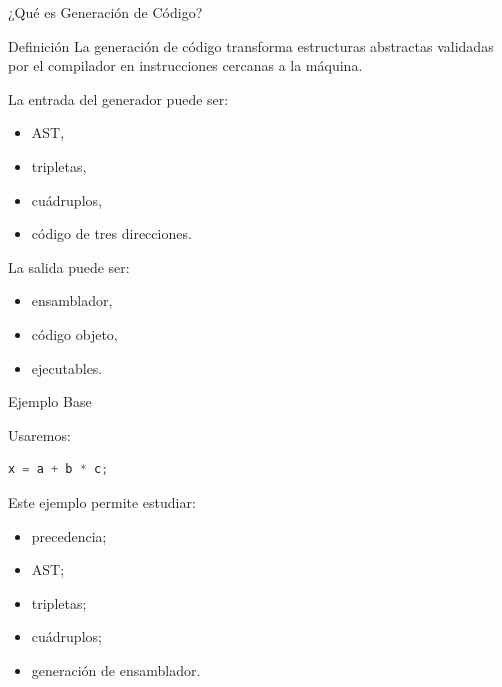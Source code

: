\documentclass{beamer}
\begin{document}
\begin{frame}{¿Qué es Generación de Código?}

\begin{block}{Definición}
La generación de código transforma estructuras abstractas validadas por el compilador en instrucciones cercanas a la máquina.
\end{block}

\vspace{0.4cm}

La entrada del generador puede ser:

\begin{itemize}
    \item AST,
    \item tripletas,
    \item cuádruplos,
    \item código de tres direcciones.
\end{itemize}

\vspace{0.4cm}

La salida puede ser:

\begin{itemize}
    \item ensamblador,
    \item código objeto,
    \item ejecutables.
\end{itemize}

\end{frame}

\begin{frame}[fragile]{Ejemplo Base}

Usaremos:

\begin{lstlisting}[language=C]
x = a + b * c;
\end{lstlisting}

\vspace{0.4cm}

Este ejemplo permite estudiar:

\begin{itemize}
    \item precedencia;
    \item AST;
    \item tripletas;
    \item cuádruplos;
    \item generación de ensamblador.
\end{itemize}

\end{frame}
\end{document}

